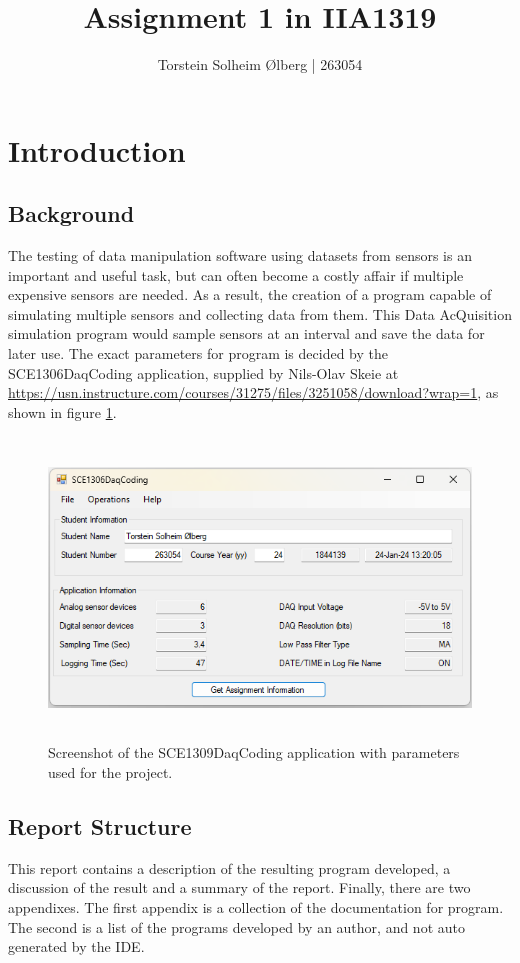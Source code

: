 \documentclass[11pt, A4paper, norsk]{article}
\author{Torstein Solheim Ølberg | 263054}
\title{Assignment 1 in IIA1319}
\begin{document}
\maketitle
\clearpage

\tableofcontents
\clearpage

	\section{Introduction}
		\subsection{Background}
The testing of data manipulation software using datasets from sensors is an important and useful task, but can often become a costly affair if multiple expensive sensors are needed. As a result, the creation of a program capable of simulating multiple sensors and collecting data from them. This Data AcQuisition simulation program would sample sensors at an interval and save the data for later use. The exact parameters for program is decided by the SCE1306DaqCoding application, supplied by Nils-Olav Skeie at \url{https://usn.instructure.com/courses/31275/files/3251058/download?wrap=1}, as shown in figure \ref{params}.
			\begin{figure}
\includegraphics[width=13cm, height=8cm]{parameters.png}
\caption{Screenshot of the SCE1309DaqCoding application with parameters used for the project.}
\label{params}
			\end{figure}
		
				\subsection{Report Structure}
This report contains a description of the resulting program developed, a discussion of the result and a summary of the report. Finally, there are two appendixes. The first appendix is a collection of the documentation for program. The second is a list of the programs developed by an author, and not auto generated by the IDE.
		
\end{document}
